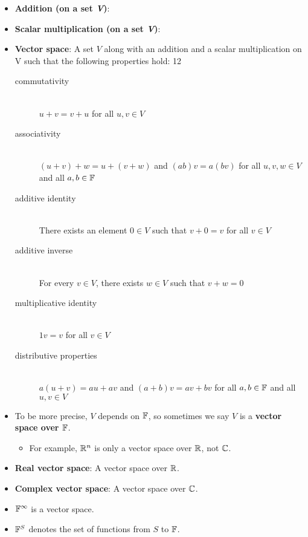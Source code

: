 \documentclass[../main.tex]{subfiles}
\begin{document}
\begin{itemize}
    \item \textbf{Addition (on a set \emph{V})}: 
    \item \textbf{Scalar multiplication (on a set \emph{V})}: 
    \item \textbf{Vector space}: \dq
        {A set $V$ along with an addition and a scalar multiplication on V such that the following properties hold:}
    {12}
    \begin{description}
        \item[commutativity] \hfill \\ $u+v=v+u$ for all $u,v\in V$
        \item[associativity] \hfill \\ $(u+v)+w=u+(v+w)$ and $(ab)v=a(bv)$ for all $u,v,w\in V$ and all $a,b\in\mathbb{F}$
        \item[additive identity] \hfill \\ There exists an element $0\in V$ such that $v+0=v$ for all $v\in V$
        \item[additive inverse] \hfill \\ For every $v\in V$, there exists $w\in V$ such that $v+w=0$
        \item[multiplicative identity] \hfill \\ $1v=v$ for all $v\in V$
        \item[distributive properties] \hfill \\ $a(u+v)=au+av$ and $(a+b)v=av+bv$ for all $a,b\in\mathbb{F}$ and all $u,v\in V$
    \end{description}
    \item To be more precise, $V$ depends on $\mathbb{F}$, so sometimes we say $V$ is a \textbf{vector space over $\mathbb{F}$}.
    \begin{itemize}
        \item For example, $\mathbb{R}^n$ is only a vector space over $\mathbb{R}$, not $\mathbb{C}$.
    \end{itemize}
    \item \textbf{Real vector space}: A vector space over $\mathbb{R}$.
    \item \textbf{Complex vector space}: A vector space over $\mathbb{C}$.
    \item $\mathbb{F}^\infty$ is a vector space.
    \item $\mathbb{F}^S$ denotes the set of functions from $S$ to $\mathbb{F}$.

\end{itemize}
\end{document}

